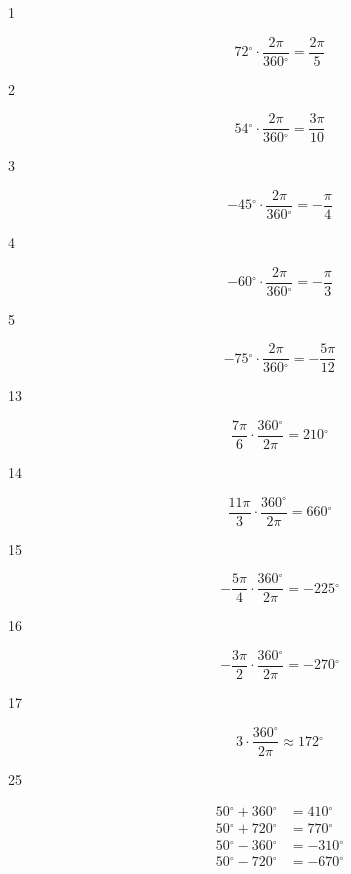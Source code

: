 \documentclass{exam}
\newcommand{\degree}{\ensuremath{^\circ}}
\begin{document}
    \begin{description}
      \item[1] 
        \[
          72 \degree \cdot \frac{2 \pi}{360 \degree} = \boxed{ \frac{2 \pi}{5} }
        \]

      \item[2] 
        \[
          54 \degree \cdot \frac{2 \pi}{360 \degree} = \boxed{ \frac{3 \pi}{10} }
        \]

      \item[3] 
        \[
          -45 \degree \cdot \frac{2 \pi}{360 \degree} = \boxed{ -\frac{\pi}{4} }
        \]

      \item[4] 
        \[
          -60 \degree \cdot \frac{2 \pi}{360 \degree} = \boxed{ -\frac{\pi}{3} }
        \]

      \item[5] 
        \[
          -75 \degree \cdot \frac{2 \pi}{360 \degree} = \boxed{ -\frac{5 \pi}{12} }
        \]

      \item[13] 
        \[
          \frac{7 \pi}{6} \cdot \frac{360 \degree}{2 \pi} = \boxed{ 210 \degree }
        \]

      \item[14] 
        \[
          \frac{11 \pi}{3} \cdot \frac{360 \degree}{2 \pi} = \boxed{ 660 \degree }
        \]

      \item[15] 
        \[
          - \frac{5 \pi}{4} \cdot \frac{360 \degree}{2 \pi} = \boxed{ -225 \degree }
        \]

      \item[16] 
        \[
          - \frac{3 \pi}{2} \cdot \frac{360 \degree}{2 \pi} = \boxed{ -270 \degree }
        \]

      \item[17] 
        \[
          3 \cdot \frac{360 \degree}{2 \pi} \approx \boxed{ 172 \degree }
        \]

      \item[25] 
        \begin{align*}
          50 \degree + 360 \degree & = \boxed{ 410 \degree } \\
          50 \degree + 720 \degree & = \boxed{ 770 \degree } \\
          50 \degree - 360 \degree & = \boxed{ -310 \degree } \\
          50 \degree - 720 \degree & = \boxed{ -670 \degree } \\
        \end{align*}


\end{description}
\end{document}
